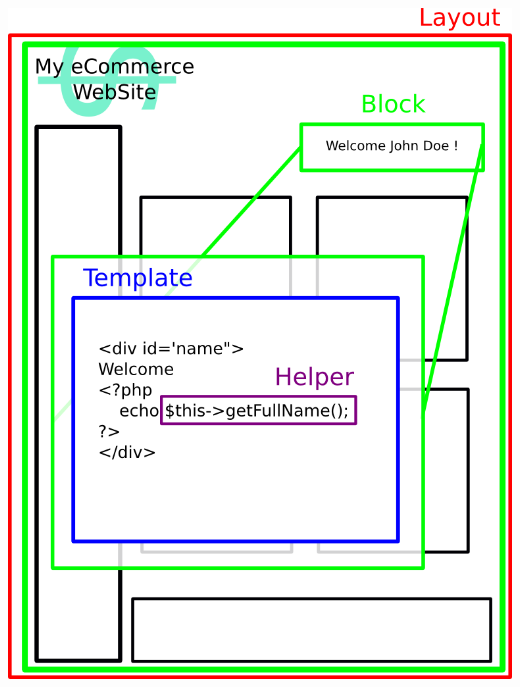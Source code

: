 \documentclass[a4paper,11pt,twoside]{report}
\begin{document}
    \begin{center}
      \includegraphics[scale=0.5]{images/magento_page_design_structure.png}  
      \label{magento_page_design_structure}
    \end{center}
    
\end{document}
